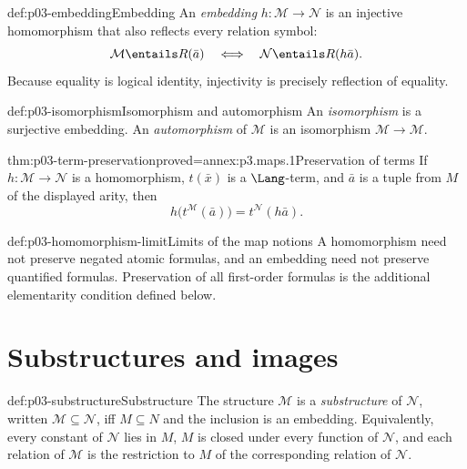 \begin{hbdefinition}{def:p03-embedding}{Embedding}
An \emph{embedding} \(h:\mathcal M\to\mathcal N\) is an injective
homomorphism that also reflects every relation symbol:
\[
 \mathcal M\entails R(\bar a)
 \quad\Longleftrightarrow\quad
 \mathcal N\entails R(h\bar a).
\]
Because equality is logical identity, injectivity is precisely reflection of
equality.
\end{hbdefinition}

\begin{hbdefinition}{def:p03-isomorphism}{Isomorphism and automorphism}
An \emph{isomorphism} is a surjective embedding.  An \emph{automorphism} of
\(\mathcal M\) is an isomorphism \(\mathcal M\to\mathcal M\).
\end{hbdefinition}

\begin{hblemma}{thm:p03-term-preservation}{proved=annex:p3.maps.1}{Preservation of terms}
If \(h:\mathcal M\to\mathcal N\) is a homomorphism, \(t(\bar x)\) is a
\(\Lang\)-term, and \(\bar a\) is a tuple from \(M\) of the displayed arity,
then
\[
 h\bigl(t^{\mathcal M}(\bar a)\bigr)=t^{\mathcal N}(h\bar a).
\]
\end{hblemma}

\begin{hbwarning}{def:p03-homomorphism-limit}{Limits of the map notions}
A homomorphism need not preserve negated atomic formulas, and an embedding
need not preserve quantified formulas.  Preservation of all first-order
formulas is the additional elementarity condition defined below.
\end{hbwarning}

\section{Substructures and images}
\label{sec:p03-substructures}

\begin{hbdefinition}{def:p03-substructure}{Substructure}
The structure \(\mathcal M\) is a \emph{substructure} of \(\mathcal N\),
written \(\mathcal M\subseteq\mathcal N\), iff \(M\subseteq N\) and the
inclusion is an embedding.  Equivalently, every constant of \(\mathcal N\)
lies in \(M\), \(M\) is closed under every function of \(\mathcal N\), and
each relation of \(\mathcal M\) is the restriction to \(M\) of the
corresponding relation of \(\mathcal N\).
\end{hbdefinition}

